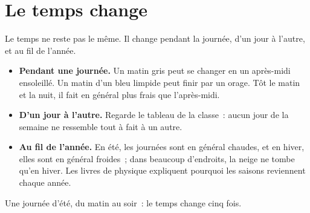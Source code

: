 \section{Le temps change}

Le temps ne reste pas le même. Il change pendant la journée, d'un jour à
l'autre, et au fil de l'année.

\begin{itemize}
  \item \textbf{Pendant une journée.} Un matin gris peut se changer en un
        après-midi ensoleillé. Un matin d'un bleu limpide peut finir par un
        orage. Tôt le matin et la nuit, il fait en général plus frais que
        l'après-midi.
  \item \textbf{D'un jour à l'autre.} Regarde le tableau de la classe~:
        aucun jour de la semaine ne ressemble tout à fait à un autre.
  \item \textbf{Au fil de l'année.} En été, les journées sont en général
        chaudes, et en hiver, elles sont en général froides~; dans beaucoup
        d'endroits, la neige ne tombe qu'en hiver. Les livres de physique
        expliquent pourquoi les saisons reviennent chaque année.
\end{itemize}

\begin{omfigure}

{\small Une journée d'été, du matin au soir~: le temps change cinq
fois.}
\label{fig:g1:watching-the-weather:day}
\end{omfigure}

